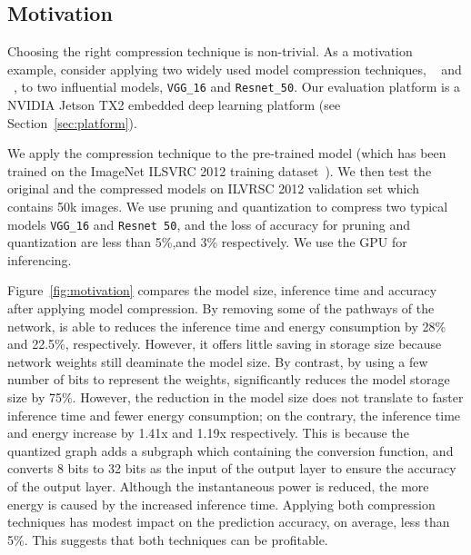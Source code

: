 \subsection{Motivation}
Choosing the right compression technique is non-trivial. As a motivation example, consider applying two widely used model compression
techniques, \pruning~\cite{manessi2017automated} and \dquantization~\cite{han2015deep}, to two influential \CNN models, \texttt{VGG\_16} 	and
\texttt{Resnet\_50}. Our evaluation platform is a NVIDIA Jetson TX2 embedded deep learning platform (see Section~\ref{sec:platform}).

 We apply the compression technique to the pre-trained model (which has been trained on the ImageNet ILSVRC 2012
training dataset~\cite{imagenet2012}). We then test the original and the compressed models on ILVRSC 2012 validation set which contains 50k images.
We use pruning and quantization to compress two typical models \texttt{VGG\_16} and \texttt{Resnet 50},
and the loss of accuracy for pruning and quantization are less than 5\%,and 3\% respectively.
We use the GPU for
inferencing.

 Figure~\ref{fig:motivation} compares the model size, inference time and accuracy after applying model
compression. By removing some of the pathways of the network, \pruning is able to reduces the inference time and
energy consumption by 28\% and 22.5\%, respectively. However, it offers
little saving in storage size because network weights still deaminate the model size. By contrast, by using a few number of bits to
represent the weights, \quantization significantly reduces the model storage size by 75\%. However, the reduction in the model size does
not translate to faster inference time and fewer energy consumption; 
on the contrary, the inference time and energy increase by 1.41x and 1.19x respectively. 
This is because the quantized graph adds a subgraph which containing the conversion function, 
and converts 8 bits to 32 bits as the input of the output layer to ensure the accuracy of the output layer.
Although the instantaneous power is reduced, the more energy is caused by the increased inference time.
Applying both compression
techniques has modest impact on the prediction accuracy, on average, less than 5\%. This suggests that both techniques can be profitable.

